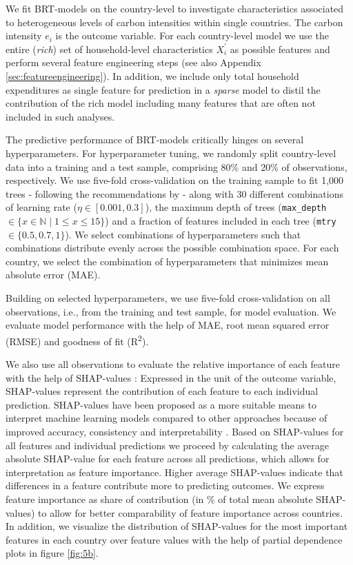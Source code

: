 \documentclass[12pt, a4paper]{article}
\begin{document}
We fit BRT-models on the country-level to investigate characteristics associated to heterogeneous levels of carbon intensities within single countries. The carbon intensity $e_{i}$ is the outcome variable. For each country-level model we use the entire (\textit{rich}) set of household-level characteristics $X_{i}^{'}$ as possible features and perform several feature engineering steps (see also Appendix \ref{sec:featureengineering}). In addition, we include only total household expenditures as single feature for prediction in a \textit{sparse} model to distil the contribution of the rich model including many features that are often not included in such analyses.

The predictive performance of BRT-models critically hinges on several hyperparameters. For hyperparameter tuning, we randomly split country-level data into a training and a test sample, comprising 80\% and 20\% of observations, respectively. We use five-fold cross-validation on the training sample to fit 1,000 trees - following the recommendations by \textcite{Elith.2008} - along with 30 different combinations of learning rate ($\eta \in [0.001,0.3]$), the maximum depth of trees (\texttt{max\_depth} $\in \{x \in \mathbb{N} \mid 1  \leq x \leq 15 \}$) and a fraction of features included in each tree (\texttt{mtry} $\in \{0.5,0.7,1\}$). We select combinations of hyperparameters such that combinations distribute evenly across the possible combination space. For each country, we select the combination of hyperparameters that minimizes mean absolute error (MAE).

Building on selected hyperparameters, we use five-fold cross-validation on all observations, i.e., from the training and test sample, for model evaluation. We evaluate model performance with the help of MAE, root mean squared error (RMSE) and goodness of fit (R\textsuperscript{2}). 

We also use all observations to evaluate the relative importance of each feature with the help of SHAP-values \autocite{Lundberg.2017}: Expressed in the unit of the outcome variable, SHAP-values represent the contribution of each feature to each individual prediction. SHAP-values have been proposed as a more suitable means to interpret machine learning models compared to other approaches because of improved accuracy, consistency and interpretability \autocite{Lundberg.2020}. Based on SHAP-values for all features and individual predictions we proceed by calculating the average absolute SHAP-value for each feature across all predictions, which allows for interpretation as feature importance. Higher average SHAP-values indicate that differences in a feature contribute more to predicting outcomes. We express feature importance as share of contribution (in \% of total mean absolute SHAP-values) to allow for better comparability of feature importance across countries. In addition, we visualize the distribution of SHAP-values for the most important features in each country over feature values with the help of partial dependence plots in figure \ref{fig:5b}. 
\end{document}
